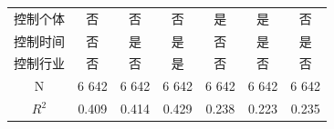 \documentclass{beamer}	%
\theoremstyle{plain}
\theoremstyle{definition}
\theoremstyle{remark}
\numberwithin{equation}{section}
\begin{document}
\begin{frame}
\begin{table}[htbp]
\begin{tabular}{ccccccc}
		              控制个体               &                       否                       &                       否                       &                      否                       &                       是                        &                       是                        &                       否                       \\
		              控制时间               &                       否                       &                       是                       &                      是                       &                       否                        &                       是                        &                       是                       \\
		              控制行业               &                       否                       &                       否                       &                      是                       &                       否                        &                       否                        &                       否                       \\
		               N                 &                     6 642                     &                     6 642                     &                    6 642                     &                     6 642                      &                     6 642                      &                     6 642                     \\
		             $R^2$               &                     0.409                     &                     0.414                     &                    0.429                     &                     0.238                      &                     0.223                      &                     0.235                     \\ \bottomrule
	\end{tabular}%
\end{table}%

\end{frame}
\end{document}
